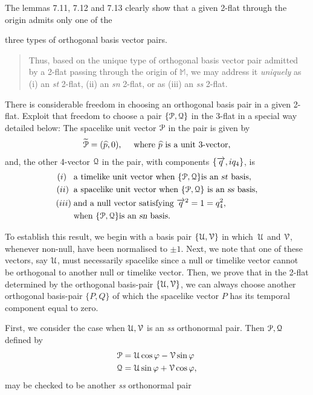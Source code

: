 The  lemmas 7.11, 7.12 and 7.13 clearly show that a 
given 2-flat through the origin admits only one of the 
 
three types of orthogonal basis vector pairs. 
\begin{quote} Thus, based on the unique type of 
orthogonal basis vector pair admitted by a 2-flat 
passing through the origin of $\mathbb{M}$, we may 
address it  \textsl{uniquely} as (i) an { \textsl{st} 
2-flat}, (ii) an { \textsl{sn} 2-flat},  or as (iii) 
an 
{ \textsl{ss} 2-flat}.
\end{quote}
\exm There is considerable freedom in choosing an 
orthogonal basis pair in a given 2-flat.  Exploit that 
freedom to choose a pair 
$\{\EuScript{P},\EuScript{Q}\}$ in the 3-flat in a 
special way detailed below: The spacelike unit vector 
$\EuScript{P}$ in the pair is given by
\begin{align}\label{geom.35}
\tilde{\EuScript{P}}= (\hat{p},0),\quad \text{ where } 
\hat{p} \text{ is a unit 3-vector},
\end{align}
and, the other 4-vector $\EuScript{Q}$ in the pair, 
with components $\{\veca{q},iq_4\}$, is
\begin{align}\label{geom.36} 
(i)\;\;\;  & \text{a 
timelike unit vector when } 
\{\EuScript{P},\EuScript{Q}\} \text{is an \textsl{st} 
basis}, \notag\\
(ii)\;\; &\text{a spacelike unit vector when } 
\{\EuScript{P},\EuScript{Q}\} 
\text{ is an  \textsl{ss} basis}, \notag\\
(iii)\; &\text{and a null vector satisfying }
\veca{q}^2= 1=q_4^2, \notag\\& \text{when } 
\{\EuScript{P},\EuScript{Q}\}  \text{is an  
\textsl{sn} basis}.
\end{align}

\prf To establish this result, we begin with a basis 
pair $\{\EuScript{U},\EuScript{V}\}$ in which 
$\,\EuScript{U}$ and $\EuScript{V}$, whenever 
non-null, 
have been normalised to $\pm 1$. Next, we note that 
one 
of these vectors, say $\EuScript{U}$, must necessarily 
spacelike since a null or timelike vector cannot be 
orthogonal to another null or timelike vector. Then, 
we 
prove that in the 2-flat determined by the orthogonal 
basis-pair $\{\EuScript{U},\EuScript{V}\}$, we can 
always choose another orthogonal basis-pair $\{P,Q\}$ 
of which the spacelike vector $P$ has its temporal 
component equal to zero.

 First, we consider the case 
when 
$\EuScript{U},\EuScript{V}$ is an   \textsl{ss} 
orthonormal pair. Then $\EuScript{P},\EuScript{Q}$ 
defined by
\begin{align}\label{geom.126}
&\EuScript{P}= 
\EuScript{U}\cos\gkf-\EuScript{V}\sin\gkf\notag \\
&\EuScript{Q}= 
\EuScript{U}\sin\gkf+\EuScript{V}\cos\gkf,
\end{align}
may  be checked to be another  \textsl{ss} orthonormal 
pair 
 
